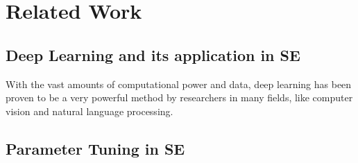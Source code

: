 \section{Related Work}


\subsection{Deep Learning and its application in SE}
With the vast amounts of computational power and data, deep learning has been proven to be a very powerful method by researchers in many fields, like computer vision and natural language processing\cite{krizhevsky2012imagenet,mikolov2013distributed,sutskever2014sequence}. 
\subsection{Parameter Tuning in SE}



